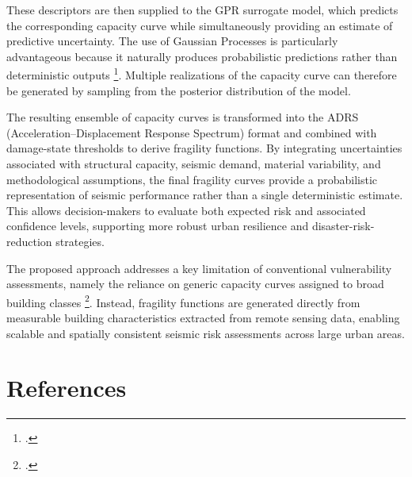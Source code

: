 \begin{refsection}
These descriptors are then supplied to the GPR surrogate model, which predicts the corresponding capacity curve while simultaneously providing an estimate of predictive uncertainty. The use of Gaussian Processes is particularly advantageous because it naturally produces probabilistic predictions rather than deterministic outputs \footcite{rasmussen2003gaussian}. Multiple realizations of the capacity curve can therefore be generated by sampling from the posterior distribution of the model.

The resulting ensemble of capacity curves is transformed into the ADRS (Acceleration--Displacement Response Spectrum) format and combined with damage-state thresholds to derive fragility functions. By integrating uncertainties associated with structural capacity, seismic demand, material variability, and methodological assumptions, the final fragility curves provide a probabilistic representation of seismic performance rather than a single deterministic estimate. This allows decision-makers to evaluate both expected risk and associated confidence levels, supporting more robust urban resilience and disaster-risk-reduction strategies.

The proposed approach addresses a key limitation of conventional vulnerability assessments, namely the reliance on generic capacity curves assigned to broad building classes \footcite{yepes-estrada_modeling_2017}. Instead, fragility functions are generated directly from measurable building characteristics extracted from remote sensing data, enabling scalable and spatially consistent seismic risk assessments across large urban areas.

\FloatBarrier

\newpage

\renewcommand{\sectionnametext}{References}
\renewcommand{\headingtextR}{\thesection. \sectionnametext}
\section{\sectionnametext}
\printbibliography[heading=none]

\end{refsection}